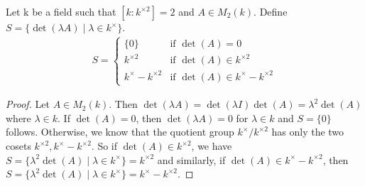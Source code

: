 \documentclass{amsart}
\begin{document}
    \begin{lemma}\label{square-quotient-cosets}
    Let k be a field such that $\left[k : k^{\times2}\right] = 2$ and $A \in M_2(k)$. Define $S = \{\det( \lambda A ) \mid \lambda \in k^{\times} \}$.  \begin{align*}
        S =
        \begin{cases}
            \{0\}                     &\text{if } \det(A) = 0 \\
            k^{\times2}              &\text{if } \det(A) \in k^{\times2} \\
            k^{\times} - k^{\times2} &\text{if } \det(A) \in k^{\times} - k^{\times2}
        \end{cases}
    \end{align*}
\end{lemma}
\begin{proof}
    Let $A \in M_2(k)$. Then $\det(\lambda A) = \det(\lambda I)\det(A) = \lambda^2\det(A)$ where $\lambda \in k$.  If $\det(A) = 0$, then $\det(\lambda A) = 0$ for $\lambda \in k$ and $S = \{0\}$ follows. Otherwise, we know that the quotient group $k^{\times}/k^{\times2}$ has only the two cosets $k^{\times2}, k^{\times} - k^{\times2}$. So if $\det(A) \in k^{\times2}$, we have $S = \{\lambda^2 \det(A) \mid \lambda \in k^{\times}\} = k^{\times2}$ and similarly, if $\det(A) \in k^{\times} - k^{\times2}$, then $S = \{\lambda^2 \det(A) \mid \lambda \in k^{\times}\} = k^{\times} - k^{\times2}$.
\end{proof}
\end{document}
